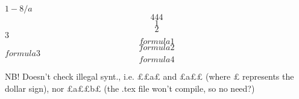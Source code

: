 \documentclass[11pt]{article}
\begin{document}
$1-8/a$
$$444$$
$$1$$$$2$$$3$
$$formula1$$$$formula2$$$formula3$$$formula4$$

NB! Doesn't check illegal synt., i.e. ££a£ and £a££ (where £ represents the dollar sign), nor £a££b£ (the .tex file won't compile, so no need?)
\end{document}
